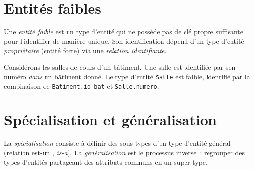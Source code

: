 \section{Entit\'es faibles}

\begin{definition}
Une \emph{entit\'e faible} est un type d'entit\'e qui ne poss\`ede pas de cl\'e propre
suffisante pour l'identifier de mani\`ere unique. Son identification d\'epend
d'un type d'entit\'e \emph{propri\'etaire} (entit\'e forte) via une
\emph{relation identifiante}.
\end{definition}

\begin{exemple}
Consid\'erons les salles de cours d'un b\^atiment. Une salle est identifi\'ee
par son num\'ero \emph{dans} un b\^atiment donn\'e. Le type d'entit\'e \texttt{Salle}
est faible, identifi\'e par la combinaison de \texttt{Batiment.id\_bat} et
\texttt{Salle.numero}.
\end{exemple}

\begin{center}
\end{center}

\section{Sp\'ecialisation et g\'en\'eralisation}

\begin{definition}
La \emph{sp\'ecialisation} consiste \`a d\'efinir des sous-types d'un type d'entit\'e
g\'en\'eral (relation \og est-un \fg, \emph{is-a}). La \emph{g\'en\'eralisation}
est le processus inverse~: regrouper des types d'entit\'es partageant des
attributs communs en un super-type.
\end{definition}

